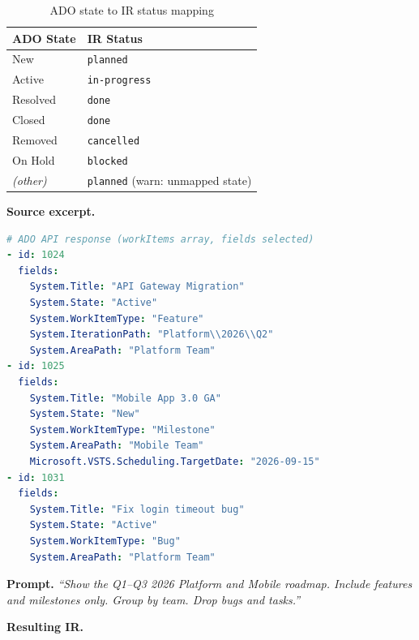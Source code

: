 \begin{table}[h]
\centering
\small
\begin{tabular}{ll}
\toprule
\textbf{ADO State} & \textbf{IR Status} \\
\midrule
New          & \texttt{planned} \\
Active       & \texttt{in-progress} \\
Resolved     & \texttt{done} \\
Closed       & \texttt{done} \\
Removed      & \texttt{cancelled} \\
On Hold      & \texttt{blocked} \\
\textit{(other)} & \texttt{planned} (warn: unmapped state) \\
\bottomrule
\end{tabular}
\caption{ADO state to IR status mapping}
\label{tab:ado-state-map}
\end{table}

\textbf{Source excerpt.}

\begin{lstlisting}[language=yaml,caption={ADO work item JSON (abridged)}]
# ADO API response (workItems array, fields selected)
- id: 1024
  fields:
    System.Title: "API Gateway Migration"
    System.State: "Active"
    System.WorkItemType: "Feature"
    System.IterationPath: "Platform\\2026\\Q2"
    System.AreaPath: "Platform Team"
- id: 1025
  fields:
    System.Title: "Mobile App 3.0 GA"
    System.State: "New"
    System.WorkItemType: "Milestone"
    System.AreaPath: "Mobile Team"
    Microsoft.VSTS.Scheduling.TargetDate: "2026-09-15"
- id: 1031
  fields:
    System.Title: "Fix login timeout bug"
    System.State: "Active"
    System.WorkItemType: "Bug"
    System.AreaPath: "Platform Team"
\end{lstlisting}

\textbf{Prompt.} \textit{``Show the Q1--Q3 2026 Platform and Mobile roadmap. Include
features and milestones only. Group by team. Drop bugs and tasks.''}

\textbf{Resulting IR.}

